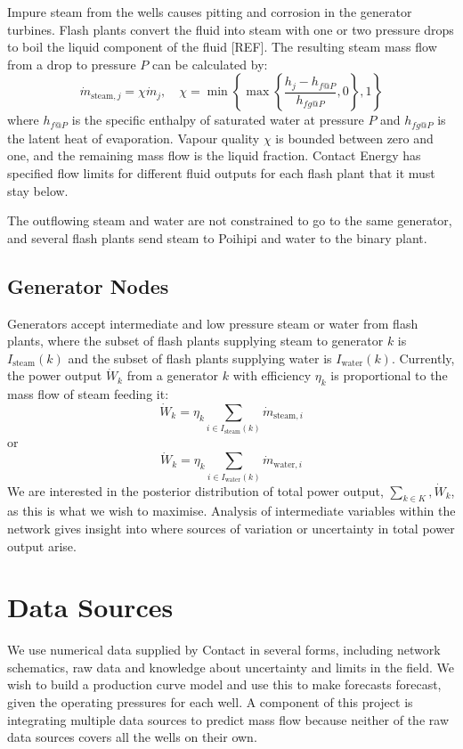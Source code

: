 \documentclass[a4paper, 12pt]{article}
\newlength{\drop}
\begin{document}
Impure steam from the wells causes pitting and corrosion in the generator turbines. Flash plants convert the fluid into steam with one or two pressure drops to boil the liquid component of the fluid [REF]. The resulting steam mass flow from a drop to pressure $P$ can be calculated by:
\begin{equation}
\dot{m}_{\text{steam},j} = \chi\dot{m}_j,\quad \chi= \min{\left\{\max{\left\{\frac{h_j - h_{f@P}}{h_{fg@P}}, 0\right\}}, 1\right\}}
\end{equation}
where $h_{f@P}$ is the specific enthalpy of saturated water at pressure $P$ and $h_{fg@P}$ is the latent heat of evaporation. Vapour quality $\chi$ is bounded between zero and one, and the remaining mass flow is the liquid fraction. Contact Energy has specified flow limits for different fluid outputs for each flash plant that it must stay below.

The outflowing steam and water are not constrained to go to the same generator, and several flash plants send steam to Poihipi and water to the binary plant.

\subsection{Generator Nodes}
Generators accept intermediate and low pressure steam or water from flash plants, where the subset of flash plants supplying steam to generator $k$ is $I_{\text{steam}}(k)$ and the subset of flash plants supplying water is $I_{\text{water}}(k)$. Currently, the power output $\dot{W}_k$ from a generator $k$ with efficiency $\eta_k$ is proportional to the mass flow of steam feeding it:
\begin{equation}
\dot{W}_k = \eta_k \sum_{i\in I_{\text{steam}}(k)} \dot{m}_{\text{steam},i}
\end{equation}
or
\begin{equation}
\dot{W}_k = \eta_k \sum_{i\in I_{\text{water}}(k)} \dot{m}_{\text{water},i} \label{eq:power}
\end{equation}
We are interested in the posterior distribution of total power output, $\sum_{k\in K}, \dot{W}_k$, as this is what we wish to maximise. Analysis of intermediate variables within the network gives insight into where sources of variation or uncertainty in total power output arise.

\section{Data Sources}
We use numerical data supplied by Contact in several forms, including network schematics, raw data and knowledge about uncertainty and limits in the field. We wish to build a production curve model and use this to make forecasts forecast, given the operating pressures for each well. A component of this project is integrating multiple data sources to predict mass flow because neither of the raw data sources covers all the wells on their own.
\end{document}
